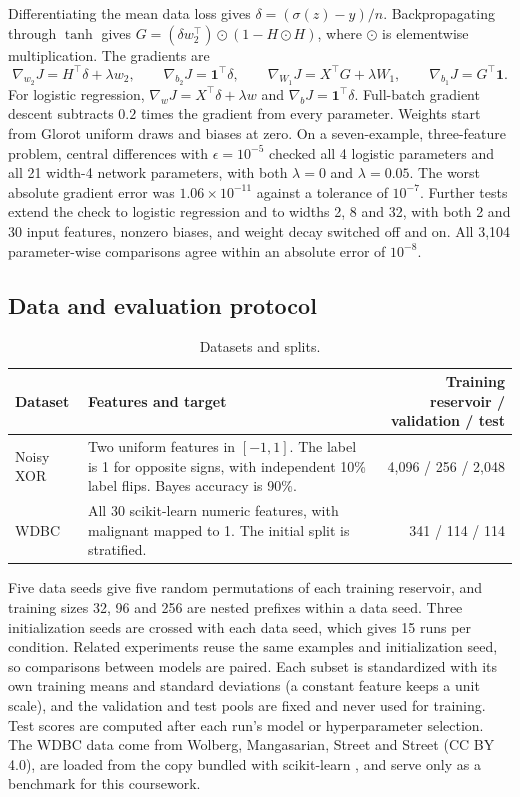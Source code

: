 \documentclass[11pt]{article}
\newcommand{\ones}{\mathbf{1}}
\begin{document}
Differentiating the mean data loss gives $\delta=(\sigma(z)-y)/n$. Backpropagating through $\tanh$ \cite{rumelhart1986} gives $G=(\delta w_2^\top)\odot(1-H\odot H)$, where $\odot$ is elementwise multiplication. The gradients are
\begin{equation}
\nabla_{w_2}J=H^\top\delta+\lambda w_2,\qquad
\nabla_{b_2}J=\ones^\top\delta,\qquad
\nabla_{W_1}J=X^\top G+\lambda W_1,\qquad
\nabla_{b_1}J=G^\top\ones .
\end{equation}
For logistic regression, $\nabla_w J=X^\top\delta+\lambda w$ and $\nabla_b J=\ones^\top\delta$. Full-batch gradient descent subtracts $0.2$ times the gradient from every parameter. Weights start from Glorot uniform draws \cite{glorot2010} and biases at zero. On a seven-example, three-feature problem, central differences with $\epsilon=10^{-5}$ checked all 4 logistic parameters and all 21 width-4 network parameters, with both $\lambda=0$ and $\lambda=0.05$. The worst absolute gradient error was $1.06\times10^{-11}$ against a tolerance of $10^{-7}$. Further tests extend the check to logistic regression and to widths 2, 8 and 32, with both 2 and 30 input features, nonzero biases, and weight decay switched off and on. All 3,104 parameter-wise comparisons agree within an absolute error of $10^{-8}$.

\subsection{Data and evaluation protocol}

\begin{table}[H]
\centering
\small
\begin{tabular}{@{}l>{\raggedright\arraybackslash}p{8.2cm}r@{}}
\toprule
Dataset & Features and target & Training reservoir / validation / test \\
\midrule
Noisy XOR & Two uniform features in $[-1,1]$. The label is 1 for opposite signs, with independent 10\% label flips. Bayes accuracy is 90\%. & 4,096 / 256 / 2,048 \\
WDBC & All 30 scikit-learn numeric features, with malignant mapped to 1. The initial split is stratified. & 341 / 114 / 114 \\
\bottomrule
\end{tabular}
\caption{Datasets and splits.}
\end{table}

Five data seeds give five random permutations of each training reservoir, and training sizes 32, 96 and 256 are nested prefixes within a data seed. Three initialization seeds are crossed with each data seed, which gives 15 runs per condition. Related experiments reuse the same examples and initialization seed, so comparisons between models are paired. Each subset is standardized with its own training means and standard deviations (a constant feature keeps a unit scale), and the validation and test pools are fixed and never used for training. Test scores are computed after each run's model or hyperparameter selection. The WDBC data come from Wolberg, Mangasarian, Street and Street \cite{wdbc} (CC BY 4.0), are loaded from the copy bundled with scikit-learn \cite{sklearn}, and serve only as a benchmark for this coursework.
\end{document}
